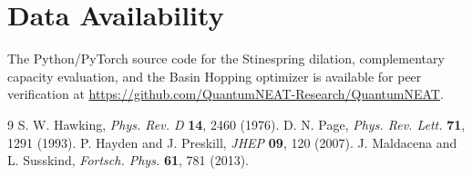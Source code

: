 \documentclass[twocolumn,prl,aps,floatfix]{revtex4-2}
\begin{document}
\section{Data Availability}
The Python/PyTorch source code for the Stinespring dilation, complementary capacity evaluation, and the Basin Hopping optimizer is available for peer verification at \url{https://github.com/QuantumNEAT-Research/QuantumNEAT}.

\begin{thebibliography}{9}
 S. W. Hawking, \emph{Phys. Rev. D} \textbf{14}, 2460 (1976).
 D. N. Page, \emph{Phys. Rev. Lett.} \textbf{71}, 1291 (1993).
 P. Hayden and J. Preskill, \emph{JHEP} \textbf{09}, 120 (2007).
 J. Maldacena and L. Susskind, \emph{Fortsch. Phys.} \textbf{61}, 781 (2013).
\end{thebibliography}
\end{document}
